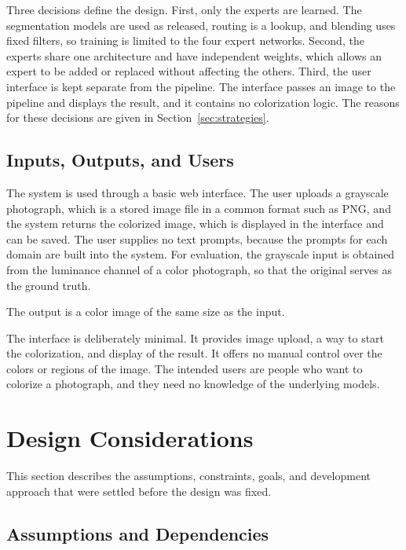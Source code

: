 \documentclass{FastFyp}
\begin{document}
Three decisions define the design. First, only the experts are learned. The segmentation models are used as released, routing is a lookup, and blending uses fixed filters, so training is limited to the four expert networks. Second, the experts share one architecture and have independent weights, which allows an expert to be added or replaced without affecting the others. Third, the user interface is kept separate from the pipeline. The interface passes an image to the pipeline and displays the result, and it contains no colorization logic. The reasons for these decisions are given in Section~\ref{sec:strategies}.

\subsection{Inputs, Outputs, and Users}

The system is used through a basic web interface. The user uploads a grayscale photograph, which is a stored image file in a common format such as PNG, and the system returns the colorized image, which is displayed in the interface and can be saved. The user supplies no text prompts, because the prompts for each domain are built into the system. For evaluation, the grayscale input is obtained from the luminance channel of a color photograph, so that the original serves as the ground truth.

The output is a color image of the same size as the input.

The interface is deliberately minimal. It provides image upload, a way to start the colorization, and display of the result. It offers no manual control over the colors or regions of the image. The intended users are people who want to colorize a photograph, and they need no knowledge of the underlying models.


\section{Design Considerations}
\label{sec:considerations}

This section describes the assumptions, constraints, goals, and development approach that were settled before the design was fixed.

\subsection{Assumptions and Dependencies}
\end{document}
